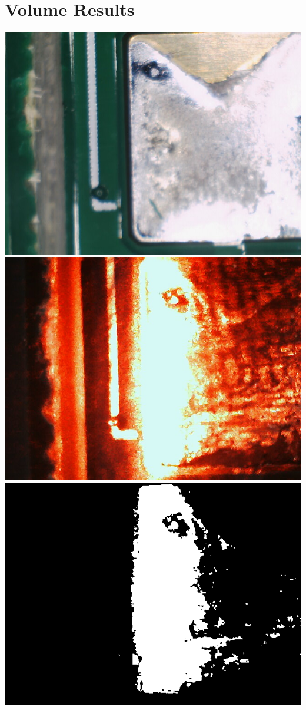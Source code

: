 \documentclass[12pt]{article}
\begin{document}
\section{Volume Results}
\includegraphics{images/volume_results/solder_led_hole.png}
\includegraphics{images/volume_results/solder_laser_hole.png}
\includegraphics{images/volume_results/binary_image_hole.png}
\end{document}
